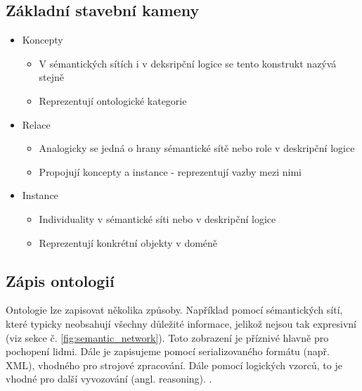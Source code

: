 \subsection{Základní stavební kameny}
\begin{itemize}
\item Koncepty
\begin{itemize}
\item V sémantických sítích i v deksripční logice se tento konstrukt nazývá stejně
\item Reprezentují ontologické kategorie
\end{itemize}
\item Relace
\begin{itemize}
\item Analogicky se jedná o hrany sémantické sítě nebo role v deskripční logice
\item Propojují koncepty a instance - reprezentují vazby mezi nimi
\end{itemize}
\item Instance
\begin{itemize}
\item Individuality v sémantické síti nebo v deskripční logice
\item Reprezentují konkrétní objekty v doméně \cite{Stephan2007}
\end{itemize}
\end{itemize}
\subsection{Zápis ontologií}
Ontologie lze zapisovat několika způsoby. Například pomocí sémantických sítí, které typicky neobsahují všechny důležité informace, jelikož nejsou tak expresivní (viz sekce č. \ref{fig:semantic_network}). Toto zobrazení je příznivé hlavně pro pochopení lidmi. Dále je zapisujeme pomocí serializovaného formátu (např. XML), vhodného pro strojové zpracování. Dále pomocí logických vzorců, to je vhodné pro další vyvozování (angl. reasoning). \cite{Stephan2007}.

